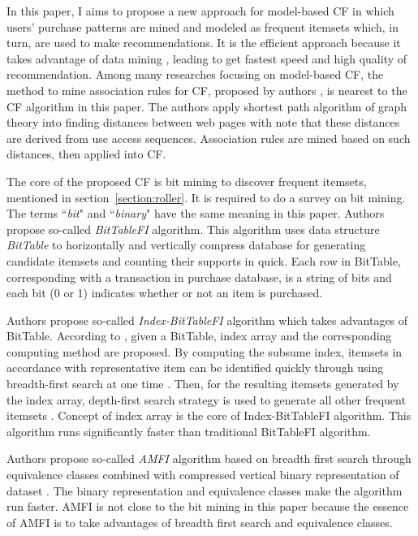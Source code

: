 \documentclass{article}
\begin{document}
In this paper, I aims to propose a new approach for model-based CF in which users' purchase patterns are mined and modeled as frequent itemsets which, in turn, are used to make recommendations. It is the efficient approach because it takes advantage of data mining \cite[pp.~227-250]{han:datamining}, leading to get fastest speed and high quality of recommendation. Among many researches focusing on model-based CF, the method to mine association rules for CF, proposed by authors \cite{shyu:associationrules}, is nearest to the CF algorithm in this paper. The authors \cite{shyu:associationrules} apply shortest path algorithm of graph theory into finding distances between web pages with note that these distances are derived from use access sequences. Association rules are mined based on such distances, then applied into CF.

The core of the proposed CF is bit mining to discover frequent itemsets, mentioned in section~\ref{section:roller}. It is required to do a survey on bit mining. The terms ``\textit{bit}" and ``\textit{binary}" have the same meaning in this paper.
Authors \cite{dong:bittablefi} propose so-called \textit{BitTableFI} algorithm. This algorithm uses data structure \textit{BitTable} to horizontally and vertically compress database for generating candidate itemsets and counting their supports in quick. Each row in BitTable, corresponding with a transaction in purchase database, is a string of bits and each bit (0 or 1) indicates whether or not an item is purchased.

Authors \cite{song:indexbittablefi} propose so-called \textit{Index-BitTableFI} algorithm which takes advantages of BitTable. According to \cite[p.~508]{song:indexbittablefi}, given a BitTable, index array and the corresponding computing method are proposed. By computing the subsume index, itemsets in accordance with representative item can be identified quickly through using breadth-first search at one time \cite[p.~509]{song:indexbittablefi}. Then, for the resulting itemsets generated by the index array, depth-first search strategy is used to generate all other frequent itemsets \cite[p.~510]{song:indexbittablefi}. Concept of index array is the core of Index-BitTableFI algorithm. This algorithm runs significantly faster than traditional BitTableFI algorithm.

Authors \cite{leon:compression} propose so-called \textit{AMFI} algorithm based on breadth first search through equivalence classes combined with compressed vertical binary representation of dataset \cite[p.~486]{leon:compression}. The binary representation and equivalence classes make the algorithm run faster. AMFI is not close to the bit mining in this paper because the essence of AMFI is to take advantages of breadth first search and equivalence classes.
\end{document}
